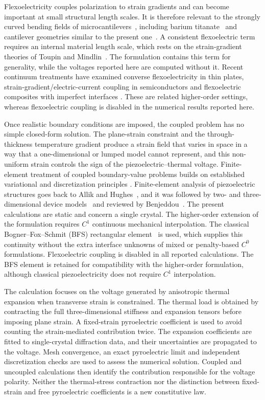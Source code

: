 \documentclass[a4paper,12pt]{elsarticle}
\begin{document}
Flexoelectricity couples polarization to strain gradients and can become important
at small structural length scales. It is therefore
relevant to the strongly curved bending fields of microcantilevers~\cite{Tagantsev1986,Cross2006,Zubko2013}, including barium titanate~\cite{MaCross2006}
and cantilever geometries similar to the present one~\cite{Huang2007,Mao2016,Abdollahi2014}. A consistent flexoelectric term requires an
internal material length scale, which rests on the strain-gradient theories of Toupin
and Mindlin~\cite{Toupin1962,Mindlin1964,MindlinEshel1968}. The formulation
contains this term for generality, while the voltages reported here are computed
without it. Recent continuum treatments have examined converse flexoelectricity in thin plates, strain-gradient/electric-current coupling in semiconductors and flexoelectric composites with imperfect interfaces \cite{IJESYurkov2023,IJESQu2025,IJESSerpilli2026}. These are related higher-order settings, whereas flexoelectric coupling is disabled in the numerical results reported here.

Once realistic boundary conditions are imposed, the coupled problem has no simple
closed-form solution. The plane-strain constraint and the through-thickness temperature
gradient produce a strain field that varies in space in a way that a one-dimensional or
lumped model cannot represent, and this non-uniform strain controls the sign of the
piezoelectric--thermal voltage. Finite-element treatment of coupled boundary-value problems builds on established variational and discretization principles \cite{Bathe1996}.
Finite-element analysis of piezoelectric structures goes back to Allik and Hughes~\cite{AllikHughes1970}, and it was
followed by two- and three-dimensional device models~\cite{Lerch1990,Tzou1993} and
reviewed by Benjeddou~\cite{Benjeddou2000a}. The present calculations are static and concern a single crystal. The higher-order extension of the formulation requires $C^1$
continuous mechanical interpolation. The classical
Bogner--Fox--Schmit (BFS) rectangular element~\cite{Bogner1965} is used, which supplies this continuity without the extra
interface unknowns of mixed or penalty-based $C^0$ formulations. Flexoelectric coupling is disabled in all reported calculations. The BFS
element is retained for compatibility with the higher-order formulation,
although classical piezoelectricity does not require $C^1$ interpolation.

The calculation focuses on the voltage generated by anisotropic thermal
expansion when transverse strain is constrained. The thermal
load is obtained by contracting the full three-dimensional stiffness and expansion
tensors before imposing plane strain. A fixed-strain pyroelectric coefficient is used
to avoid counting the strain-mediated contribution twice. The expansion coefficients
are fitted to single-crystal diffraction data, and their uncertainties are propagated
to the voltage. Mesh convergence, an exact pyroelectric limit and independent
discretization checks are used to assess the numerical solution. Coupled and uncoupled
calculations then identify the contribution responsible for the voltage polarity.
Neither the thermal-stress contraction nor the distinction between fixed-strain and
free pyroelectric coefficients is a new constitutive law.
\end{document}
